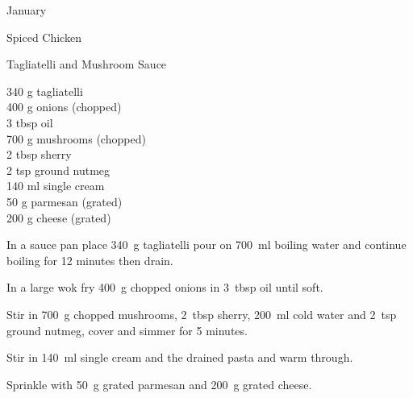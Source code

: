 \begin{menu}{January}
\begin{recipe}{2}{Spiced Chicken}
\begin{instructions}
    \end{instructions}
    \end{recipe}%
  
    \begin{recipe}{2}{Tagliatelli and Mushroom Sauce}%
		\begin{ingredients}
		340 g tagliatelli  \\
	400 g onions (chopped) \\
	3 tbsp oil  \\
	700 g mushrooms (chopped) \\
	2 tbsp sherry  \\
	2 tsp ground nutmeg  \\
	140 ml single cream  \\
	50 g parmesan (grated) \\
	200 g cheese (grated) \\
	
		\end{ingredients}
	
	
    \begin{instructions}
    \item 
    In a
    sauce pan
    place
    340~g  tagliatelli
    pour on
    700~ml  boiling water
    and continue boiling for 12 minutes then drain.
  \item 
        In a large wok fry
        400~g chopped onions
        in
        3~tbsp  oil
        until soft.
      \item 
        Stir in
        700~g chopped mushrooms,
        2~tbsp  sherry,
        200~ml  cold water
        and
        2~tsp  ground nutmeg,
        cover and simmer for 5 minutes.
      \item 
        Stir in
        140~ml  single cream
        and the drained pasta
        and warm through.
      \item 
        Sprinkle with
        50~g grated parmesan
        and
        200~g grated cheese.
      
    \end{instructions}
    \end{recipe}%
  

\end{menu}
